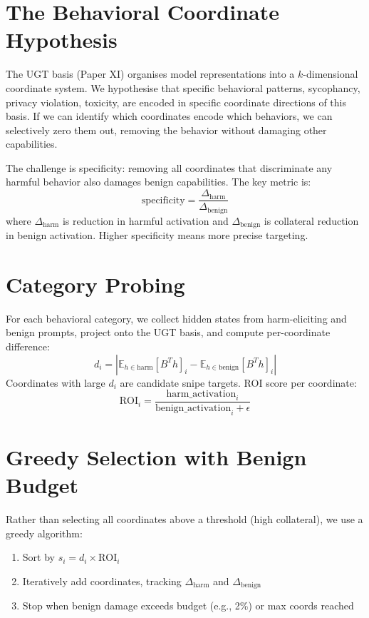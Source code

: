 \documentclass[11pt]{article}
\begin{document}
\section{The Behavioral Coordinate Hypothesis}

The UGT basis (Paper XI) organises model representations into a $k$-dimensional coordinate system. We hypothesise that specific behavioral patterns, sycophancy, privacy violation, toxicity, are encoded in specific coordinate directions of this basis. If we can identify which coordinates encode which behaviors, we can selectively zero them out, removing the behavior without damaging other capabilities.

The challenge is specificity: removing all coordinates that discriminate any harmful behavior also damages benign capabilities. The key metric is:
\begin{equation}
\mathrm{specificity} = \frac{\Delta_{\mathrm{harm}}}{\Delta_{\mathrm{benign}}}
\end{equation}
where $\Delta_{\mathrm{harm}}$ is reduction in harmful activation and $\Delta_{\mathrm{benign}}$ is collateral reduction in benign activation. Higher specificity means more precise targeting.

\section{Category Probing}

For each behavioral category, we collect hidden states from harm-eliciting and benign prompts, project onto the UGT basis, and compute per-coordinate difference:
\begin{equation}
d_i = |\mathbb{E}_{h \in \mathrm{harm}}[B^T h]_i - \mathbb{E}_{h \in \mathrm{benign}}[B^T h]_i|
\end{equation}
Coordinates with large $d_i$ are candidate snipe targets. ROI score per coordinate:
\begin{equation}
\mathrm{ROI}_i = \frac{\mathrm{harm\_activation}_i}{\mathrm{benign\_activation}_i + \epsilon}
\end{equation}

\section{Greedy Selection with Benign Budget}

Rather than selecting all coordinates above a threshold (high collateral), we use a greedy algorithm:
\begin{enumerate}[nosep]
\item Sort by $s_i = d_i \times \mathrm{ROI}_i$
\item Iteratively add coordinates, tracking $\Delta_{\mathrm{harm}}$ and $\Delta_{\mathrm{benign}}$
\item Stop when benign damage exceeds budget (e.g., 2\%) or max coords reached
\end{enumerate}
\end{document}
